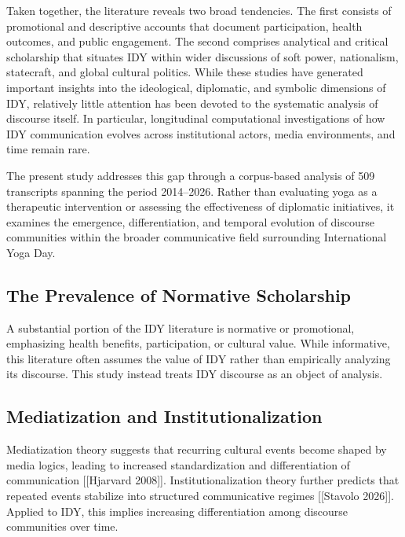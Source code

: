 \documentclass[11pt]{article}
\begin{document}
Taken together, the literature reveals two broad tendencies. The first consists of promotional and descriptive accounts
that document participation, health outcomes, and public engagement. The second comprises analytical and critical
scholarship that situates IDY within wider discussions of soft power, nationalism, statecraft, and global cultural
politics. While these studies have generated important insights into the ideological, diplomatic, and symbolic
dimensions of IDY, relatively little attention has been devoted to the systematic analysis of discourse itself. In
particular, longitudinal computational investigations of how IDY communication evolves across institutional actors,
media environments, and time remain rare.


The present study addresses this gap through a corpus-based analysis of 509 transcripts spanning the period 2014--2026.
Rather than evaluating yoga as a therapeutic intervention or assessing the effectiveness of diplomatic initiatives, it
examines the emergence, differentiation, and temporal evolution of discourse communities within the broader
communicative field surrounding International Yoga Day.




\subsection{The Prevalence of Normative Scholarship}



A substantial portion of the IDY literature is normative or promotional, emphasizing health benefits, participation, or
cultural value. While informative, this literature often assumes the value of IDY rather than empirically analyzing its
discourse. This study instead treats IDY discourse as an object of analysis.



\subsection{Mediatization and Institutionalization}



Mediatization theory suggests that recurring cultural events become shaped by media logics, leading to increased
standardization and differentiation of communication [[Hjarvard 2008]]. Institutionalization theory further predicts that repeated events
stabilize into structured communicative regimes [[Stavolo 2026]]. Applied to IDY, this implies increasing differentiation among discourse communities over time.
\end{document}
